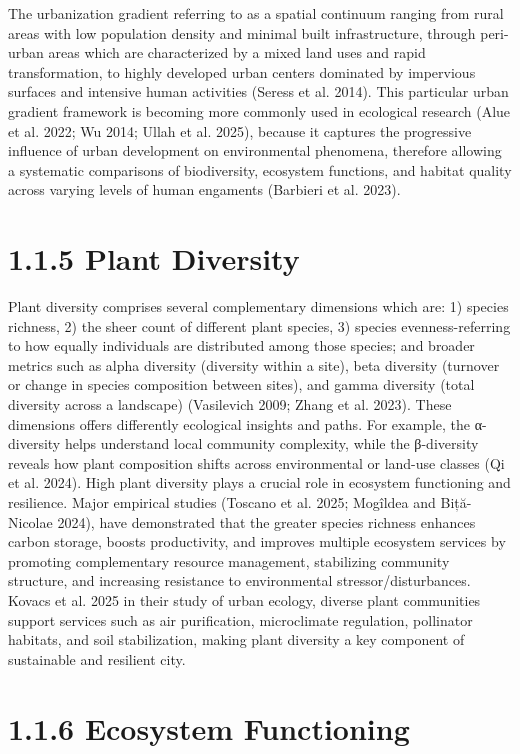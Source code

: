 The urbanization gradient referring to as a spatial continuum ranging from rural areas with low population density and minimal built infrastructure, through peri-urban areas which are characterized by a mixed land uses and rapid transformation, to highly developed urban centers dominated by impervious surfaces and intensive human activities (Seress et al. 2014). This particular urban gradient framework is becoming more commonly used in ecological research (Alue et al. 2022; Wu 2014; Ullah et al. 2025), because it captures the progressive influence of urban development on environmental phenomena, therefore allowing a systematic comparisons of biodiversity, ecosystem functions, and habitat quality across varying levels of human engaments (Barbieri et al. 2023).
\hypertarget{plant-diversity}{%
\section{\texorpdfstring{\textbf{1.1.5 Plant Diversity}}{1.1.5 Plant Diversity}}\label{plant-diversity}}

Plant diversity comprises several complementary dimensions which are: 1) species richness, 2) the sheer count of different plant species, 3) species evenness-referring to how equally individuals are distributed among those species; and broader metrics such as alpha diversity (diversity within a site), beta diversity (turnover or change in species composition between sites), and gamma diversity (total diversity across a landscape) (Vasilevich 2009; Zhang et al. 2023). These dimensions offers differently ecological insights and paths. For example, the α-diversity helps understand local community complexity, while the β-diversity reveals how plant composition shifts across environmental or land-use classes (Qi et al. 2024). High plant diversity plays a crucial role in ecosystem functioning and resilience. Major empirical studies (Toscano et al. 2025; Mogîldea and Biță-Nicolae 2024), have demonstrated that the greater species richness enhances carbon storage, boosts productivity, and improves multiple ecosystem services by promoting complementary resource management, stabilizing community structure, and increasing resistance to environmental stressor/disturbances. Kovacs et al. 2025 in their study of urban ecology, diverse plant communities support services such as air purification, microclimate regulation, pollinator habitats, and soil stabilization, making plant diversity a key component of sustainable and resilient city.
\hypertarget{ecosystem-functioning}{%
\section{\texorpdfstring{\textbf{1.1.6 Ecosystem Functioning}}{1.1.6 Ecosystem Functioning}}\label{ecosystem-functioning}}

